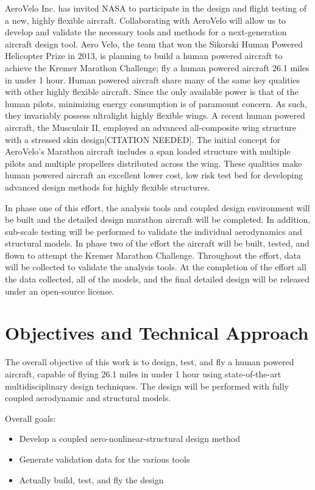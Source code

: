 \documentclass[]{aiaa-tc}
\begin{document}
    AeroVelo Inc. has invited NASA to participate in the design and flight testing of a new, highly flexible aircraft. 
    Collaborating with AeroVelo will allow us to develop and validate the necessary tools and methods for a 
    next-generation aircraft design tool. Aero Velo, the team that won the Sikorski Human Powered Helicopter Prize in 2013, 
    is planning to build a human powered aircraft to achieve the Kremer Marathon Challenge; fly a human 
    powered aircraft 26.1 miles in under 1 hour. Human powered aircraft share many of the same key qualities 
    with other highly flexible aircraft. Since the only available power is that of the human pilots, minimizing 
    energy consumption is of paramount concern. As such, they invariably possess ultralight highly flexible wings. 
    A recent human powered aircraft, the Musculair II, employed an advanced all-composite wing structure 
    with a stressed skin design[CITATION NEEDED]. The initial concept for AeroVelo's Marathon aircraft includes 
    a span loaded structure with multiple pilots and multiple propellers distributed across the wing. These qualities 
    make human powered aircraft an excellent lower cost, low risk test bed for developing advanced design methods 
    for highly flexible structures. 

    In phase one of this effort, the analysis tools and coupled design environment will be built and 
    the detailed design marathon aircraft will be completed. In addition, sub-scale testing will be 
    performed to validate the individual aerodynamics and structural models. In phase two of the effort
    the aircraft will be built, tested, and flown to attempt the Kremer Marathon Challenge. Throughout 
    the effort, data will be collected to validate the analysis tools. At the completion of the effort 
    all the data collected, all of the models, and the final detailed design will be released under 
    an open-source license.

  \section{Objectives and Technical Approach}

    The overall objective of this work is to design, test, and fly a human powered aircraft, 
    capable of flying 26.1 miles in under 1 hour using state-of-the-art multidisciplinary 
    design techniques. The design will be performed with fully coupled
    aerodynamic and structural models. 

    Overall goals: 
    \begin{itemize}
        \item Develop a coupled aero-nonlinear-structural design method 
        \item Generate validation data for the various tools 
        \item Actually build, test, and fly the design
    \end{itemize}
\end{document}
